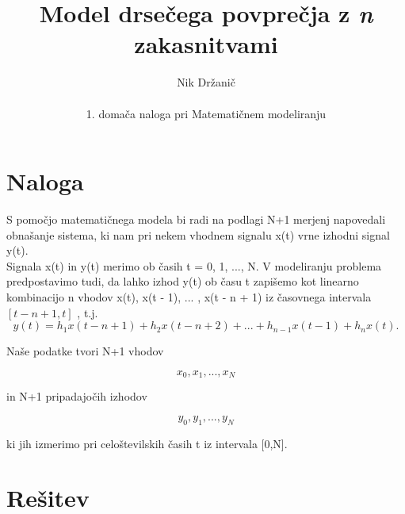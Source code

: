 \documentclass[A4]{article}
\begin{document}
\title {Model drsečega povprečja z \emph{n} zakasnitvami}
\author{Nik Držanič \\  \\ 1. domača naloga pri Matematičnem modeliranju}
\maketitle
\section{Naloga}
S pomočjo matematičnega modela bi radi na podlagi N+1 merjenj napovedali obnašanje sistema, ki nam pri nekem vhodnem signalu x(t) vrne izhodni signal y(t).
\\ Signala x(t) in y(t) merimo ob časih t = 0, 1, ..., N. V modeliranju problema predpostavimo tudi, da lahko izhod y(t) ob času t zapišemo kot linearno kombinacijo n vhodov x(t), x(t - 1), ... , x(t - n + 1) iz časovnega intervala
 \\ $[t - n + 1, t]$ , t.j. 
\[
	y(t) = h_{1} x(t - n + 1) + h_{2} x(t - n + 2) + ... + h_{n-1}x(t-1) + h_{n}x(t). 
\]
\begin{flushleft}
Naše podatke tvori N+1 vhodov 
\end{flushleft}
{\centering
\[ 
x_{0},x_{1},...,x_{N}
\] \par
}
in N+1 pripadajočih izhodov 
{\centering
\[ 
y_{0},y_{1},...,y_{N}
\] \par
}
ki jih izmerimo pri celoštevilskih časih t iz intervala [0,N]. 
\section {Rešitev} 
\end{document}
